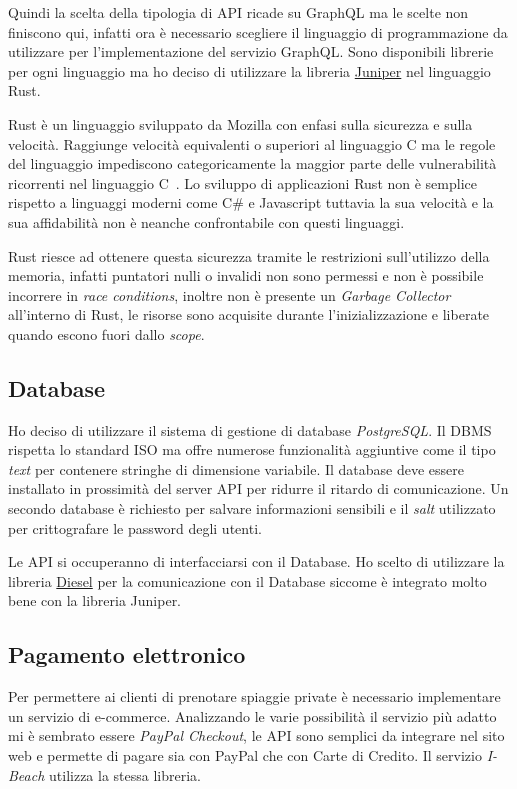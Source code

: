 Quindi la scelta della tipologia di API ricade su GraphQL ma le scelte non finiscono qui, infatti ora \`e necessario scegliere il linguaggio di programmazione da utilizzare per l'implementazione del servizio GraphQL\@. Sono disponibili librerie per ogni linguaggio ma ho deciso di utilizzare la libreria \href{https://github.com/graphql-rust/juniper}{Juniper} nel linguaggio Rust.

Rust \`e un linguaggio sviluppato da Mozilla con enfasi sulla sicurezza e sulla velocit\`a. Raggiunge velocit\`a equivalenti o superiori al linguaggio C ma le regole del linguaggio impediscono categoricamente la maggior parte delle vulnerabilit\`a ricorrenti nel linguaggio C~\cite{rust-website}. Lo sviluppo di applicazioni Rust non \`e semplice rispetto a linguaggi moderni come C\# e Javascript tuttavia la sua velocit\`a e la sua affidabilit\`a non \`e neanche confrontabile con questi linguaggi.

Rust riesce ad ottenere questa sicurezza tramite le restrizioni sull'utilizzo della memoria, infatti puntatori nulli o invalidi non sono permessi e non \`e possibile incorrere in \emph{race conditions}, inoltre non \`e presente un \emph{Garbage Collector} all'interno di Rust, le risorse sono acquisite durante l'inizializzazione e liberate quando escono fuori dallo \emph{scope}.

\subsection{Database}%
\label{sub:database}

Ho deciso di utilizzare il sistema di gestione di database \emph{PostgreSQL}. Il DBMS rispetta lo standard ISO ma offre numerose funzionalit\`a aggiuntive come il tipo \emph{text} per contenere stringhe di dimensione variabile. Il database deve essere installato in prossimit\`a del server API per ridurre il ritardo di comunicazione. Un secondo database \`e richiesto per salvare informazioni sensibili e il \emph{salt} utilizzato per crittografare le password degli utenti.

Le API si occuperanno di interfacciarsi con il Database. Ho scelto di utilizzare la libreria \href{https://diesel.rs/}{Diesel} per la comunicazione con il Database siccome \`e integrato molto bene con la libreria Juniper.

\subsection{Pagamento elettronico}%
\label{sub:pagamento_elettronico}

Per permettere ai clienti di prenotare spiaggie private \`e necessario implementare un servizio di e-commerce. Analizzando le varie possibilit\`a il servizio pi\`u adatto mi \`e sembrato essere \emph{PayPal Checkout}, le API sono semplici da integrare nel sito web e permette di pagare sia con PayPal che con Carte di Credito. Il servizio \emph{I-Beach} utilizza la stessa libreria.
